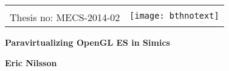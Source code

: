 
\newcommand{\intellogo}[1]{%
	\texttt{[image: Intel-logo.pdf]}%
}
\newcommand{\logossize}{3cm}


{\pagestyle{empty}
\changepage{5cm}{1cm}{-0.5cm}{-0.5cm}{}{-2cm}{}{}{}
\noindent%
{\small
\begin{tabular}{p{} p{}}
&\multirow{4}{*}{\texttt{[image: bthnotext]}}\\ %
Thesis no: MECS-2014-02\\
\end{tabular}}

\begin{center}
\par\vspace {7cm}
{\Huge\textbf{Paravirtualizing OpenGL ES in Simics}} %
\par\vspace {0.5cm}
{\Large\textbf{}} %
\par\vspace {3cm}
{\Large\textbf{Eric Nilsson}}
\par\vspace {7cm}
\end{center}

\noindent
\iftoggle{intellogo}{
	{\small
	\begin{tabular}{p{0.75\textwidth} p{0.25\textwidth}}
	Faculty of Computing&\multirow{4}{*}{\intellogo{\logossize}}\\
	Blekinge Institute of Technology\\
	SE--371 79 Karlskrona, Sweden
	\end{tabular}}
}{
	{\small
	\begin{tabular}{p{0.75\textwidth} p{0.25\textwidth}}
	Faculty of Computing&\multirow{4}{*}{}\\
	Blekinge Institute of Technology\\
	SE--371 79 Karlskrona, Sweden
	\end{tabular}}
}
\clearpage
}


